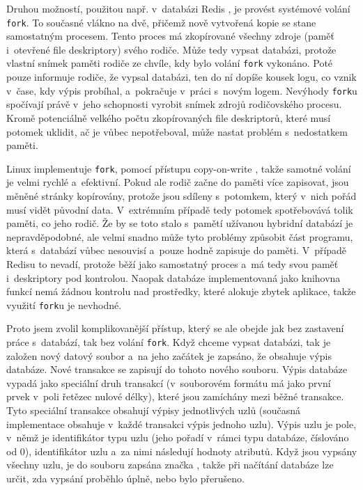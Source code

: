 Druhou možností, použitou např. v~databázi Redis \cite{Redis}, je provést systémové
volání \verb|fork|.
To  současné vlákno na dvě, přičemž nově vytvořená kopie se stane
samostatným procesem. Tento proces má zkopírované všechny zdroje (paměť
i~otevřené file deskriptory) svého rodiče. Může tedy vypsat databázi, protože
vlastní snímek paměti rodiče ze chvíle, kdy bylo volání \verb|fork| vykonáno.
Poté pouze informuje rodiče, že vypsal databázi, ten do ní dopíše kousek logu,
co vznik v~čase, kdy výpis probíhal, a~pokračuje v~práci s~novým logem.
Nevýhody \verb|fork|u spočívají právě v~jeho schopnosti vyrobit snímek zdrojů
rodičovského procesu. Kromě potenciálně velkého počtu zkopírovaných file deskriptorů,
které musí potomek uklidit, ač je vůbec nepotřeboval, může nastat problém s~nedostatkem
paměti. 

Linux implementuje \verb|fork|, pomocí přístupu copy-on-write
\cite{linuxCOW}, takže samotné volání je velmi rychlé a~efektivní. Pokud ale rodič
začne do paměti více zapisovat, jsou měněné stránky kopírovány, protože jsou
sdíleny s~potomkem, který v~nich pořád musí vidět původní data. V~extrémním případě
tedy potomek spotřebovává tolik paměti, co jeho rodič. Že by se toto stalo s~pamětí
užívanou hybridní databází je nepravděpodobné, ale velmi snadno může tyto problémy
způsobit část programu, která s~databází vůbec nesouvisí a~pouze hodně zapisuje do paměti.
V~případě
Redisu to nevadí, protože běží jako samostatný proces a~má tedy svou paměť 
i~deskriptory pod kontrolou.
Naopak databáze implementovaná jako knihovna funkcí nemá žádnou kontrolu nad prostředky,
které alokuje zbytek aplikace, takže využití \verb|fork|u je nevhodné.

Proto jsem zvolil komplikovanější přístup, který se ale obejde jak bez zastavení
práce s~databází, tak bez volání \verb|fork|. Když chceme vypsat databázi,
tak je založen nový datový soubor a~na jeho začátek je zapsáno, že obsahuje výpis
databáze. Nové transakce se zapisují do tohoto nového souboru. Výpis databáze
vypadá jako speciální druh transakcí (v~souborovém formátu má jako první prvek
v~poli řetězec nulové délky), které jsou zamíchány mezi běžné transakce. Tyto speciální
transakce obsahují výpisy jednotlivých uzlů (současná implementace obsahuje v~každé
transakci výpis jednoho uzlu). Výpis uzlu je pole, v~němž je identifikátor typu uzlu
(jeho pořadí v~rámci typu databáze, číslováno od 0), 
identifikátor uzlu
a~za nimi následují hodnoty atributů. Když jsou vypsány všechny uzlu, je do souboru
zapsána značka , takže při načítání databáze lze určit, zda vypsání
proběhlo úplně, nebo bylo přerušeno.

